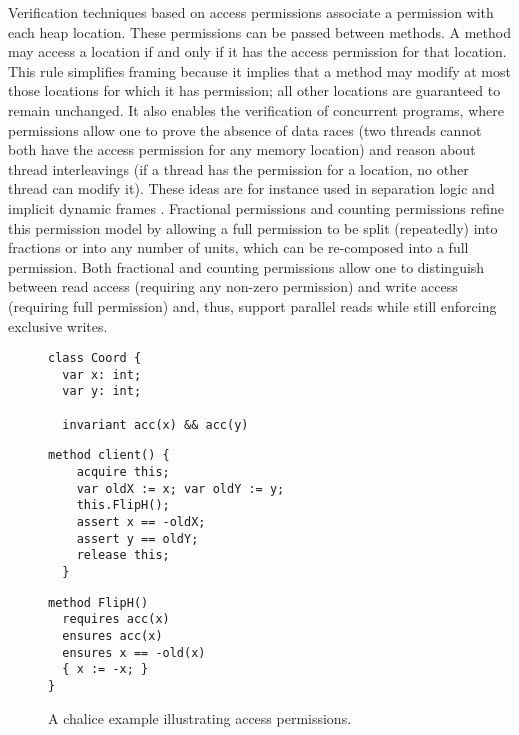 \documentclass{llncs}
\begin{document}
Verification techniques based on access permissions associate a
permission with each heap location. These permissions can be passed
between methods. A method may access a location if and only if it has
the access permission for that location. This rule simplifies framing
because it implies that a method may modify at most those locations
for which it has permission; all other locations are guaranteed to
remain unchanged. It also enables the verification of concurrent
programs, where permissions allow one to prove the absence of data
races (two threads cannot both have the access permission for any
memory location) and reason about thread interleavings (if a thread
has the permission for a location, no other thread can modify it).
These ideas are for instance used in separation logic
\cite{REY02} and implicit dynamic frames \cite{SJP09}.
Fractional permissions \cite{Boyland03} and counting permissions
\cite{BornatCOP05} refine this permission model by allowing a full
permission to be split (repeatedly) into fractions or into any
number of units, which can be re-composed into a full permission. 
Both fractional and counting permissions allow one to distinguish between
read access (requiring any non-zero permission) and write access
(requiring full permission) and, thus, support parallel reads
while still enforcing exclusive writes.

\begin{figure}
\goup
\goup
\goup
\setlength{\columnseprule}{0.5pt}
\setlength{\columnsep}{10pt}
\begin{multicols}{3}
\begin{lstlisting}[numbers=none]
class Coord {
  var x: int;
  var y: int;

  invariant acc(x) && acc(y)
\end{lstlisting}
\columnbreak
\begin{lstlisting}[numbers=none]
  method client() {
    acquire this;
    var oldX := x; var oldY := y;
    this.FlipH();
    assert x == -oldX;
    assert y == oldY;
    release this;
  }
\end{lstlisting}
\columnbreak
\begin{lstlisting}[numbers=none]
  method FlipH()
  requires acc(x)
  ensures acc(x)
  ensures x == -old(x) 
  { x := -x; }
}
\end{lstlisting}
\end{multicols}
\normalsize
\goup
\caption{A chalice example illustrating access permissions.}
\label{fig:permissionexample}
\goup
\goup
\goup
\end{figure}
\end{document}
